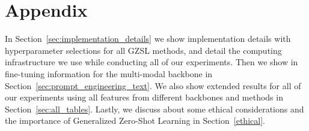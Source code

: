 
\clearpage
\appendix

\section{Appendix}

In Section~\ref{sec:implementation_details} we show implementation details with hyperparameter selections for all GZSL methods, and detail the computing infrastructure we use while conducting all of our experiments. 
Then we show in fine-tuning information for the multi-modal backbone in Section~\ref{sec:prompt_engineering_text}.
We also show extended results for all of our experiments using all features from different backbones and methods in Section~\ref{sec:all_tables}.
Lastly, we discuss about some ethical considerations and the importance of Generalized Zero-Shot Learning in Section~\ref{ethical}.




